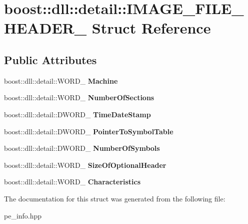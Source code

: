 \hypertarget{a00147}{}\section{boost\+:\+:dll\+:\+:detail\+:\+:I\+M\+A\+G\+E\+\_\+\+F\+I\+L\+E\+\_\+\+H\+E\+A\+D\+E\+R\+\_\+ Struct Reference}
\label{a00147}
\subsection*{Public Attributes}
\begin{DoxyCompactItemize}
\item 
boost\+::dll\+::detail\+::\+W\+O\+R\+D\+\_\+ {\bfseries Machine}\hypertarget{a00147_a74d0493f559c1790ca07841a9f433d68}{}\label{a00147_a74d0493f559c1790ca07841a9f433d68}

\item 
boost\+::dll\+::detail\+::\+W\+O\+R\+D\+\_\+ {\bfseries Number\+Of\+Sections}\hypertarget{a00147_a2e08f6cff4a1d7c7cc4edd0b7376905c}{}\label{a00147_a2e08f6cff4a1d7c7cc4edd0b7376905c}

\item 
boost\+::dll\+::detail\+::\+D\+W\+O\+R\+D\+\_\+ {\bfseries Time\+Date\+Stamp}\hypertarget{a00147_a64d58055b32aa8c8f5e759a7cd7041a0}{}\label{a00147_a64d58055b32aa8c8f5e759a7cd7041a0}

\item 
boost\+::dll\+::detail\+::\+D\+W\+O\+R\+D\+\_\+ {\bfseries Pointer\+To\+Symbol\+Table}\hypertarget{a00147_a55b924300db035a900d8acfcb42ed53f}{}\label{a00147_a55b924300db035a900d8acfcb42ed53f}

\item 
boost\+::dll\+::detail\+::\+D\+W\+O\+R\+D\+\_\+ {\bfseries Number\+Of\+Symbols}\hypertarget{a00147_a68ef366c62acd1c494b34f051c3741d9}{}\label{a00147_a68ef366c62acd1c494b34f051c3741d9}

\item 
boost\+::dll\+::detail\+::\+W\+O\+R\+D\+\_\+ {\bfseries Size\+Of\+Optional\+Header}\hypertarget{a00147_a1faf8ff2d3cd8befadadcf3fbf17c9c2}{}\label{a00147_a1faf8ff2d3cd8befadadcf3fbf17c9c2}

\item 
boost\+::dll\+::detail\+::\+W\+O\+R\+D\+\_\+ {\bfseries Characteristics}\hypertarget{a00147_aa0066509ff8a4daf18e369b08880a1b2}{}\label{a00147_aa0066509ff8a4daf18e369b08880a1b2}

\end{DoxyCompactItemize}


The documentation for this struct was generated from the following file\+:\begin{DoxyCompactItemize}
\item 
pe\+\_\+info.\+hpp\end{DoxyCompactItemize}

